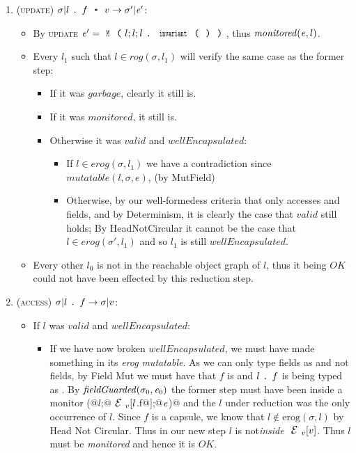 \begin{enumerate}
\item (\textsc{update}) $\sigma|l\singleDot f\equals v\rightarrow \sigma'|\e'$:
	\begin{itemize}
	  \item By \textsc{update} $\e'=\Kw{M}\oR l;l;l\singleDot\Kw{invariant}\oR\cR\cR$, thus $\mathit{monitored}({\mathit{e}},l)$.
	  \item Every $l_1$ such that $l\in \mathit{rog}(\sigma,l_1)$ will verify the same case as the former step:
	  \begin{itemize}
	  	\item If it was $\mathit{garbage}$, clearly it still is.
	  	\item If it was $\mathit{monitored}$, it still is.
	    \item Otherwise it was $\mathit{valid}$ and $\mathit{wellEncapsulated}$:
			\begin{itemize}
				\item If $l\in \mathit{erog}(\sigma,l_1)$ we have a contradiction since $mutatable(l, \sigma, e)$, (by MutField)
		    	\item Otherwise, by our well-formedess criteria that \validate{} only accesses \Q@imm@ and \Q@capsule@ fields, and by Determinism, it is clearly the case that $\mathit{valid}$ still holds;
				By HeadNotCircular it cannot be the case that $l\in \mathit{erog}(\sigma',l_1)$ and so $l_1$ is still $\mathit{wellEncapsulated}$.
		  	\end{itemize}
	  \end{itemize}
	  \item Every other $l_0$ is not in the reachable object graph of $l$,
	  thus it being $\mathit{OK}$ could not have been effected by this reduction step.
	\end{itemize}

\item (\textsc{access}) $\sigma|l\singleDot f \rightarrow \sigma|v$:
	\begin{itemize}
		\item If $l$ was $valid$ and $wellEncapsulated$:
		\begin{itemize}
			\item If we have now broken $wellEncapsulated$, we must have made something in its \emph{erog} \emph{mutatable}. As we can only type \Q@capsule@ fields as \Q@mut@ and not \Q@imm@ fields, by Field Mut we must have that $f$ is \Q@capsule@ and $l{ \mbox{ {\texttt{.}} } } f$ is being typed as \Q@mut@. By $\mathit{fieldGuarded}(\sigma_0,\e_0)$ the former step must have been inside a monitor \Q@M(@$l$\Q@;@$\ctx_v[l$\Q@.f@$]$\Q@;@${\mathit{e}}$\Q@)@
		    and the $l$ under reduction was the only occurrence of $l$.
		    Since $f$ is a capsule, we know that $l\notin \text{erog}(\sigma,l)$
		    by Head Not Circular. Thus in our new step $l$ is not\emph{inside} $\ctx_v[v]$. Thus $l$ must be \emph{monitored} and hence it is $OK$.


\end{itemize}
\end{itemize}
\end{enumerate}
